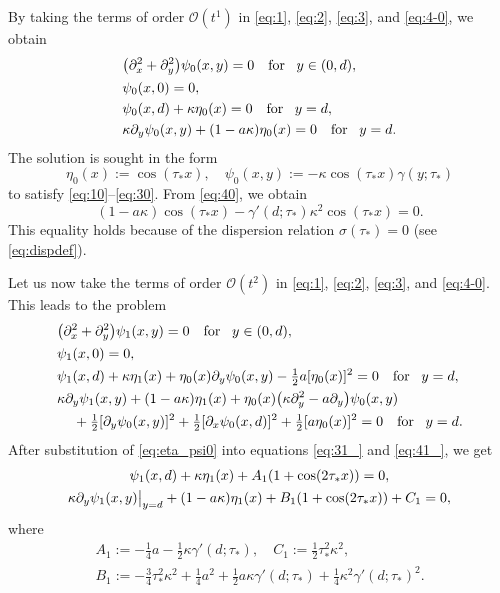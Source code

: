 \documentclass[oneside,a4paper,11pt]{article}
\theoremstyle{thmstyletwo}%
\theoremstyle{thmstylethree}%
\numberwithin{equation}{section}
\newcommand{\pd}[2][]{
\if\relax#1\relax
 \partial_{#2}%
\else
 \partial_{#2}^{#1}%
\fi}
\def\gamm{\gamma}
\def\taust{\tau_{*}}
\def\Disp{\sigma}
\def\dUd{\kappa}
\def\mddU{a}
\def\Obig{\mathcal{O}}
\begin{document}
By taking the terms of order $\Obig(t^1)$ in \eqref{eq:1}, \eqref{eq:2}, \eqref{eq:3}, and \eqref{eq:4-0}, we obtain
\begin{align}
&\bigl(\pd[2]{x}+\pd[2]{y}\bigr)\psi_{0}(x,y)=0\quad\mbox{for\!}\quad y\in (0,d),\label{eq:10}\\
&\psi_0(x,0)=0,\label{eq:20}\\
&\psi_0(x,d)+\dUd\eta_0(x)=0\quad \mbox{for\!}\quad y=d,\label{eq:30}\\
&\dUd\pd{y}\psi_0(x,y)+(1-\mddU\dUd)\eta_0(x)=0\quad \mbox{for\!}\quad y=d.\label{eq:40}
\end{align}
The solution is sought in the form
\begin{equation}
\eta_0(x):=\cos(\taust x),\quad
\psi_0(x,y):=-\dUd\cos(\taust x)\gamm(y;\taust)
\label{eq:eta_psi0}
\end{equation}
to satisfy \eqref{eq:10}--\eqref{eq:30}. From \eqref{eq:40}, we obtain
\begin{equation*}
(1-\mddU\dUd)\cos(\taust x)-\gamm'(d;\taust)\dUd^2\cos(\taust x)=0.
\end{equation*}
This equality holds because of the dispersion relation $\Disp(\taust)=0$ (see \eqref{eq:dispdef}).

Let us now take the terms of order $\Obig(t^2)$ in \eqref{eq:1}, \eqref{eq:2}, \eqref{eq:3}, and \eqref{eq:4-0}. This leads to the problem
\begin{align}
&\bigl(\pd[2]{x}+\pd[2]{y}\bigr)\psi_{1}(x , y)=0\quad\mbox{for\!}\quad y\in (0,d),\label{eq:11}\\
&\psi_1(x,0)=0,\label{eq:21}\\
&\psi_1(x,d)+\dUd\eta_1(x)+\eta_0(x)\pd{y}\psi_0(x,y)-\tfrac12 \mddU[\eta_0(x)]^2=0\quad \mbox{for\!}\quad y=d,\label{eq:31_}\\
&\dUd\pd{y}\psi_1(x,y)+(1-\mddU\dUd)\eta_1(x) +\eta_0(x)
\bigl(\dUd\pd[2]{y}-\mddU\pd{y}\bigr)\psi_0(x,y) \notag\\
&\kern4mm{}+\tfrac12[\pd{y}\psi_0(x,y)]^2 +
\tfrac12[\pd{x}\psi_0(x,d)]^2+\tfrac12[\mddU\eta_0(x)]^2
=0\quad \mbox{for\!}\quad y=d.\label{eq:41_}
\end{align}
After substitution of \eqref{eq:eta_psi0} into  equations \eqref{eq:31_} and \eqref{eq:41_}, we get
\begin{gather}
\psi_1(x,d)+\dUd\eta_1(x)+A_1(1+\cos(2\taust x))=0,\label{eq:31}\\
\dUd\pd{y}\psi_1(x,y)\bigr|_{y=d}+(1-\mddU\dUd)\eta_1(x)+B_1(1+\cos(2\taust x))+C_1=0,\label{eq:41}
\end{gather}
where
\begin{equation*}
\begin{gathered}
A_1:=-\tfrac{1}{4}\mddU - \tfrac{1}{2}\dUd\gamm'(d;\taust),\quad C_1:=\tfrac{1}{2}\taust^2 \dUd^2,\\
B_1:=-\tfrac{3}{4}\taust^2\dUd^2+\tfrac{1}{4}\mddU^2+\tfrac{1}{2}\mddU\dUd\gamm'(d;\taust)+\tfrac{1}{4}\dUd^2\gamm'(d;\taust)^2.
\end{gathered}
\end{equation*}
\end{document}
